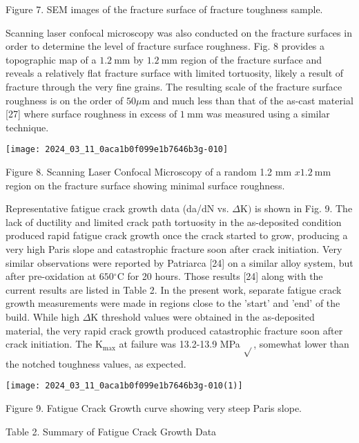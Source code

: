 \documentclass[10pt]{article}
\begin{document}
Figure 7. SEM images of the fracture surface of fracture toughness sample.

Scanning laser confocal microscopy was also conducted on the fracture surfaces in order to determine the level of fracture surface roughness. Fig. 8 provides a topographic map of a $1.2 \mathrm{~mm}$ by $1.2 \mathrm{~mm}$ region of the fracture surface and reveals a relatively flat fracture surface with limited tortuosity, likely a result of fracture through the very fine grains. The resulting scale of the fracture surface roughness is on the order of $50 \mu \mathrm{m}$ and much less than that of the as-cast material [27] where surface roughness in excess of $1 \mathrm{~mm}$ was measured using a similar technique.

\begin{center}
\texttt{[image: 2024\_03\_11\_0aca1b0f099e1b7646b3g-010]}
\end{center}

Figure 8. Scanning Laser Confocal Microscopy of a random 1.2 mm $x 1.2 \mathrm{~mm}$ region on the fracture surface showing minimal surface roughness.

Representative fatigue crack growth data (da/dN vs. $\Delta \mathrm{K})$ is shown in Fig. 9. The lack of ductility and limited crack path tortuosity in the as-deposited condition produced rapid fatigue crack growth once the crack started to grow, producing a very high Paris slope and catastrophic fracture soon after crack initiation. Very similar observations were reported by Patriarca [24] on a similar alloy system, but after pre-oxidation at $650{ }^{\circ} \mathrm{C}$ for 20 hours. Those results [24] along with the current results are listed in Table 2. In the present work, separate fatigue crack growth measurements were made in regions close to the 'start' and 'end' of the build. While high $\Delta \mathrm{K}$ threshold values were obtained in the as-deposited material, the very rapid crack growth produced catastrophic fracture soon after crack initiation. The $\mathrm{K}_{\max }$ at failure was 13.2-13.9 MPa $\sqrt{ }$, somewhat lower than the notched toughness values, as expected.

\begin{center}
\texttt{[image: 2024\_03\_11\_0aca1b0f099e1b7646b3g-010(1)]}
\end{center}

Figure 9. Fatigue Crack Growth curve showing very steep Paris slope.

Table 2. Summary of Fatigue Crack Growth Data
\end{document}
